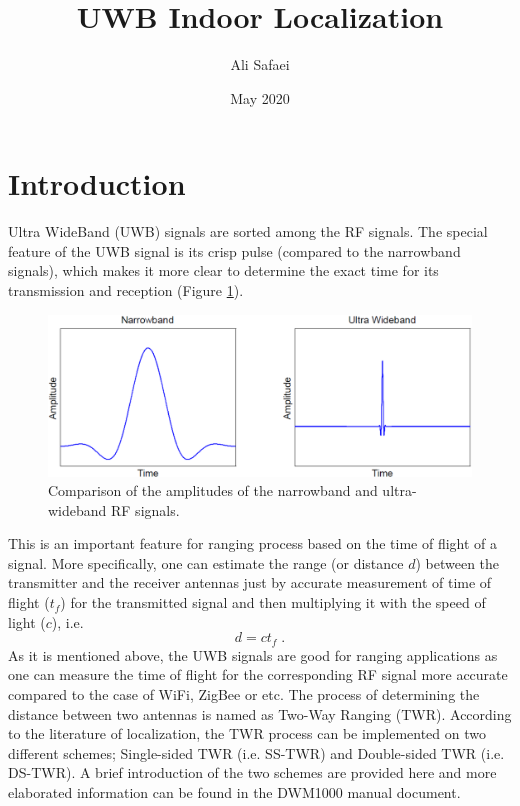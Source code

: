 \documentclass{article}
\title{UWB Indoor Localization}
\author{Ali Safaei}
\date{May 2020}
\begin{document}
\maketitle

\section{Introduction}
Ultra WideBand (UWB) signals are sorted among the RF signals. The special feature of the UWB signal is its crisp pulse (compared to the narrowband signals), which makes it more clear to determine the exact time for its transmission and reception (Figure \ref{Fig_01}).

\begin{figure}[thpb]
\centering
\includegraphics[scale=0.45]{Pics/UWB_signal.PNG}
\caption{Comparison of the amplitudes of the narrowband and ultra-wideband RF signals.}
\label{Fig_01}
\end{figure}

This is an important feature for ranging process based on the time of flight of a signal. More specifically, one can estimate the range (or distance $d$) between the transmitter and the receiver antennas just by accurate measurement of time of flight ($t_f$) for the transmitted signal and then multiplying it with the speed of light ($c$), i.e.
\begin{equation} \label{Eq_01_01}
d = c t_f \;.
\end{equation}
As it is mentioned above, the UWB signals are good for ranging applications as one can measure the time of flight for the corresponding RF signal more accurate compared to the case of WiFi, ZigBee or etc.
The process of determining the distance between two antennas is named as Two-Way Ranging (TWR).
According to the literature of localization, the TWR process can be implemented on two different schemes; Single-sided TWR (i.e. SS-TWR) and Double-sided TWR (i.e. DS-TWR).
A brief introduction of the two schemes are provided here and more elaborated information can be found in the DWM1000 manual document. 
\end{document}
